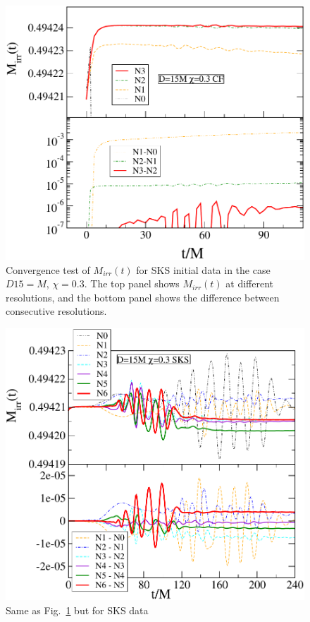 \begin{figure}
 \includegraphics[scale=0.95]{chap5/CFMConvergence1}
  \caption{Convergence test of $M_{irr}(t)$ for SKS initial data in the
  case $D15=M$, $\chi=0.3$. The top panel shows $M_{irr}(t)$ at
  different resolutions, and the bottom panel shows the difference
  between consecutive resolutions.}
  \label{fig:CFMConvergence1}
\end{figure}

\begin{figure}[!htbp]
 \includegraphics[scale=0.95]{chap5/SKSMConvergence1}
  \caption{Same as Fig.~\ref{fig:CFMConvergence1} but for SKS data
    }

  \label{fig:SKSMConvergence1}
\end{figure}

